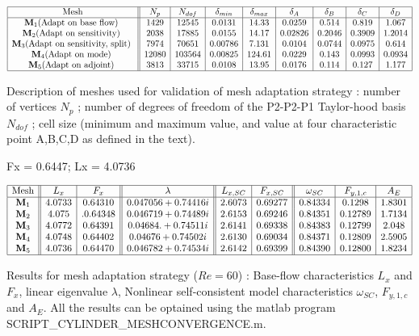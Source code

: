 \documentclass[twocolumn,10pt]{asme2ej}
\begin{document}
\begin{table*}
$$
\begin{array}{|c||c|c|c|c|c|c|c|c|c|}
\hline
\mbox{Mesh} & N_p & N_{dof} & \delta_{min} & \delta_{max} & \delta_A  & \delta_B  & \delta_C  & \delta_D  \\
\hline
\mathbf{M}_1 \mbox{(Adapt on base flow) } & 1429 & 12545	& 0.0131 & 14.33 		& 0.0259 	& 0.514 	& 0.819 	& 1.067 \\   
\mathbf{M}_2 \mbox{(Adapt on sensitivity) } & 2038 & 17885	& 0.0155 & 14.17 		& 0.02826 & 0.2046 	& 0.3909 	& 1.2014 	\\
\mathbf{M}_3 \mbox{(Adapt on sensitivity, split) } & 7974 & 70651	& 0.00786 & 7.131  		& 0.0104 	& 0.0744 	&   0.0975 & 0.614   \\
\mathbf{M}_4 \mbox{(Adapt on mode) } 	& 12080  & 103564		&0.00825	& 124.61		& 0.0229	& 0.143	& 0.0993	& 0.0934 \\
\mathbf{M}_5 \mbox{(Adapt on adjoint) } 	& 3813 	& 33715		& 0.0108	& 13.95		& 0.0176 	& 0.114	& 0.127	& 1.177  \\
\hline
\end{array}
$$
\caption{Description of meshes used for validation of mesh adaptation strategy : number of vertices $N_p$ ; number of degrees of freedom of the P2-P2-P1 Taylor-hood basis $N_{dof}$ ; cell size (minimum and maximum value, and value at four characteristic point A,B,C,D as defined in the text). 
 }
\label{tab:conv1}
\end{table*}


Fx = 0.6447; Lx = 4.0736
\begin{table*}
$$
\begin{array}{|c||c|c||c||c|c||c|c|c|}
\hline
\mbox{Mesh} & L_x & F_x & \lambda & L_{x,SC} & F_{x,SC} & \omega_{SC}  & F_{y,1,c} & A_{E} \\
\hline
\mathbf{M}_1 & 4.0733 & 0.64310	& 0.047056 + 0.74416i 		& 2.6073  & 0.69277 	&  0.84334 & 0.1298 & 1.8301  \\
\mathbf{M}_2 & 4.075 &.  0.64348  	& 0.046719 + 0.74489i 		& 2.6153  & 0.69246 	& 0.84351 & 0.12789 & 1.7134 \\  
\mathbf{M}_3 & 4.0772 & 0.64391 	& 0.04684. +  0.74511i 		& 2.6141  & 0.69338 	& 0.84383 & 0.12799 & 2.048   \\ 
\mathbf{M}_4 & 4.0748 & 0.64402 	& 0.04676  + 0.74502i 		& 2.6130 	& 0.69034 	& 0.84371 & 0.12809 & 2.5905 \\
\mathbf{M}_5 & 4.0736 & 0.64470	& 0.046782+0.74534i		& 2.6142 	& 0.69399		& 0.84390 & 0.12800 & 1.8234 \\
\hline
\end{array}
$$
\caption{Results for mesh adaptation strategy ($Re = 60$) : Base-flow characteristics $L_x$ and $F_x$, linear eigenvalue $\lambda$, 
Nonlinear self-consistent model characteristics  $\omega_{SC}$, $F_{y,1,c}$ and $A_E$. All the results can be optained using the matlab program
{\sf SCRIPT\_CYLINDER\_MESHCONVERGENCE.m}. }
\label{tab:conv2}
\end{table*}
\end{document}
